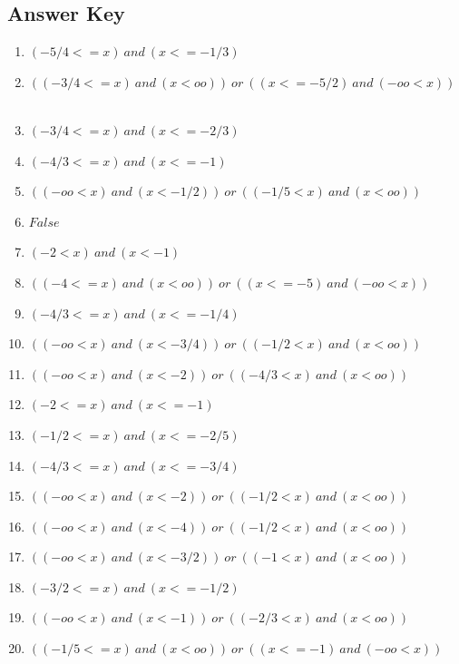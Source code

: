 \documentclass{article}
\begin{document}
\newpage

\subsection*{Answer Key}

\begin{enumerate}
\item $\displaystyle (-5/4 <= x) \ and \  (x <= -1/3) $ \ 
\item $\displaystyle ((-3/4 <= x) \ and \  (x < oo)) \ or \  ((x <= -5/2) \ and \  (-oo < x)) $ \ 
\item $\displaystyle (-3/4 <= x) \ and \  (x <= -2/3) $ \ 
\item $\displaystyle (-4/3 <= x) \ and \  (x <= -1) $ \ 
\item $\displaystyle ((-oo < x) \ and \  (x < -1/2)) \ or \  ((-1/5 < x) \ and \  (x < oo)) $ \ 
\item $\displaystyle False $ \ 
\item $\displaystyle (-2 < x) \ and \  (x < -1) $ \ 
\item $\displaystyle ((-4 <= x) \ and \  (x < oo)) \ or \  ((x <= -5) \ and \  (-oo < x)) $ \ 
\item $\displaystyle (-4/3 <= x) \ and \  (x <= -1/4) $ \ 
\item $\displaystyle ((-oo < x) \ and \  (x < -3/4)) \ or \  ((-1/2 < x) \ and \  (x < oo)) $ \ 
\item $\displaystyle ((-oo < x) \ and \  (x < -2)) \ or \  ((-4/3 < x) \ and \  (x < oo)) $ \ 
\item $\displaystyle (-2 <= x) \ and \  (x <= -1) $ \ 
\item $\displaystyle (-1/2 <= x) \ and \  (x <= -2/5) $ \ 
\item $\displaystyle (-4/3 <= x) \ and \  (x <= -3/4) $ \ 
\item $\displaystyle ((-oo < x) \ and \  (x < -2)) \ or \  ((-1/2 < x) \ and \  (x < oo)) $ \ 
\item $\displaystyle ((-oo < x) \ and \  (x < -4)) \ or \  ((-1/2 < x) \ and \  (x < oo)) $ \ 
\item $\displaystyle ((-oo < x) \ and \  (x < -3/2)) \ or \  ((-1 < x) \ and \  (x < oo)) $ \ 
\item $\displaystyle (-3/2 <= x) \ and \  (x <= -1/2) $ \ 
\item $\displaystyle ((-oo < x) \ and \  (x < -1)) \ or \  ((-2/3 < x) \ and \  (x < oo)) $ \ 
\item $\displaystyle ((-1/5 <= x) \ and \  (x < oo)) \ or \  ((x <= -1) \ and \  (-oo < x)) $ \ 

\end{enumerate}
\end{document}
